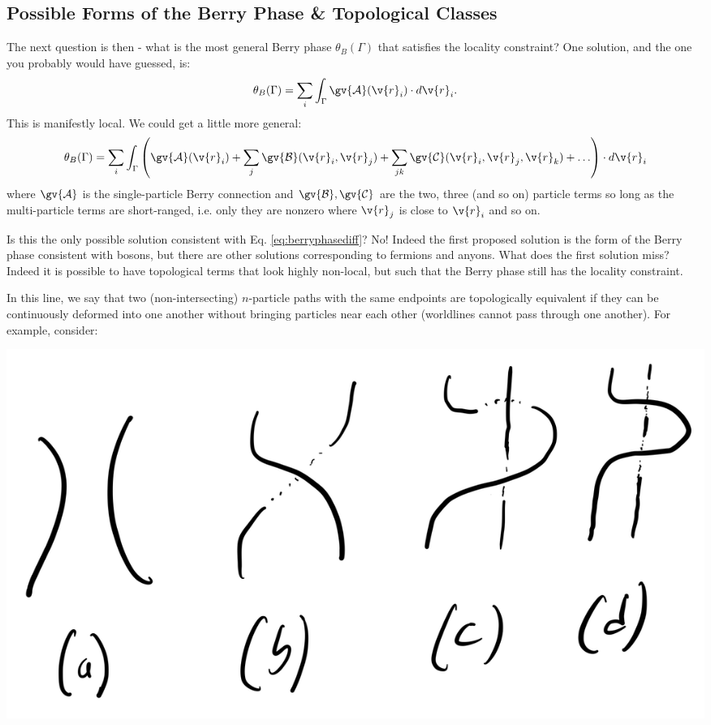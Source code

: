 \subsection{Possible Forms of the Berry Phase \& Topological Classes}
The next question is then - what is the most general Berry phase $\theta_B(\Gamma)$ that satisfies the locality constraint? One solution, and the one you probably would have guessed, is:
\begin{equation}
    \theta_B(\Gamma) = \sum_i\int_\Gamma\gv{\mathcal{A}}(\v{r}_i)\cdot d\v{r}_i.
\end{equation}
This is manifestly local. We could get a little more general:
\begin{equation}\label{eq:thetabshortrange}
    \theta_B(\Gamma) = \sum_i\int_\Gamma\left(\gv{\mathcal{A}}(\v{r}_i) + \sum_j \gv{\mathcal{B}}(\v{r}_i, \v{r}_j) + \sum_{jk}\gv{\mathcal{C}}(\v{r}_i, \v{r}_j, \v{r}_k) + \ldots\right)\cdot d\v{r}_i
\end{equation}
where $\gv{\mathcal{A}}$ is the single-particle Berry connection and $\gv{\mathcal{B}}, \gv{\mathcal{C}}$ are the two, three (and so on) particle terms so long as the multi-particle terms are short-ranged, i.e. only they are nonzero where $\v{r}_j$ is close to $\v{r}_i$ and so on. 

Is this the only possible solution consistent with Eq. \eqref{eq:berryphasediff}? No! Indeed the first proposed solution is the form of the Berry phase consistent with bosons, but there are other solutions corresponding to fermions and anyons. What does the first solution miss? Indeed it is possible to have topological terms that look highly non-local, but such that the Berry phase still has the locality constraint.

In this line, we say that two (non-intersecting) $n$-particle paths with the same endpoints are topologically equivalent if they can be continuously deformed into one another without bringing particles near each other (worldlines cannot pass through one another). For example, consider:

\begin{center}
    \includegraphics[scale=0.3]{Lectures/Images/lec4-topclasses.png}
\end{center}

